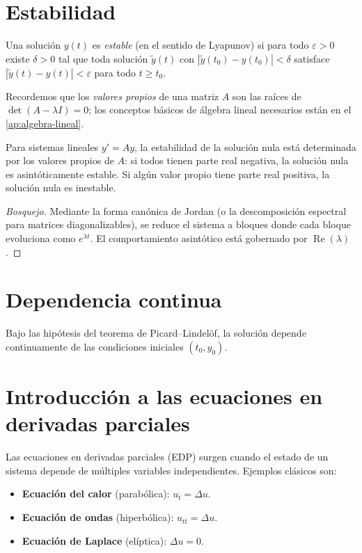 \section{Estabilidad}

\begin{definition}
\label{def:estabilidad}
Una solución $y(t)$ es \emph{estable} (en el sentido de Lyapunov) si para todo $\varepsilon>0$ existe $\delta>0$ tal que toda solución $\widetilde{y}(t)$ con $|\widetilde{y}(t_0)-y(t_0)|<\delta$ satisface $|\widetilde{y}(t)-y(t)|<\varepsilon$ para todo $t\geq t_0$.
\end{definition}

Recordemos que los \emph{valores propios} de una matriz $A$ son las raíces de $\det(A-\lambda I)=0$; los conceptos básicos de álgebra lineal necesarios están en el \cref{ap:algebra-lineal}.

\begin{theorem}
\label{teo:estabilidad-lineal}
Para sistemas lineales $y'=Ay$, la estabilidad de la solución nula está determinada por los valores propios de $A$: si todos tienen parte real negativa, la solución nula es asintóticamente estable. Si algún valor propio tiene parte real positiva, la solución nula es inestable.
\end{theorem}
\begin{proof}[Bosquejo]
Mediante la forma canónica de Jordan (o la descomposición espectral para matrices diagonalizables), se reduce el sistema a bloques donde cada bloque evoluciona como $e^{\lambda t}$. El comportamiento asintótico está gobernado por $\operatorname{Re}(\lambda)$.
\end{proof}

\section{Dependencia continua}

\begin{theorem}
\label{teo:dependencia-continua}
Bajo las hipótesis del teorema de Picard--Lindelöf, la solución depende continuamente de las condiciones iniciales $(t_0,y_0)$.
\end{theorem}

\section{Introducción a las ecuaciones en derivadas parciales}

Las ecuaciones en derivadas parciales (EDP) surgen cuando el estado de un sistema depende de múltiples variables independientes. Ejemplos clásicos son:
\begin{itemize}
  \item \textbf{Ecuación del calor} (parabólica): $u_t=\Delta u$.
  \item \textbf{Ecuación de ondas} (hiperbólica): $u_{tt}=\Delta u$.
  \item \textbf{Ecuación de Laplace} (elíptica): $\Delta u=0$.
\end{itemize}

